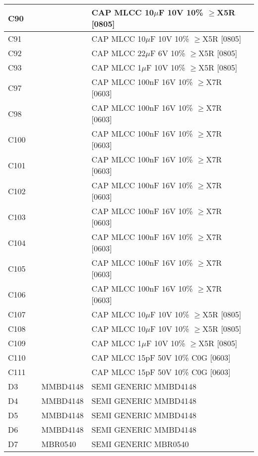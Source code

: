 \begin{longtable}{|l|l|l|l|l|}
\hline
C90 &  &  & CAP MLCC 10\ensuremath{\mu}F 10V 10\% \ensuremath{\geq}X5R [0805] &  \\
\hline
C91 &  &  & CAP MLCC 10\ensuremath{\mu}F 10V 10\% \ensuremath{\geq}X5R [0805] &  \\
\hline
C92 &  &  & CAP MLCC 22\ensuremath{\mu}F 6V 10\% \ensuremath{\geq}X5R [0805] &  \\
\hline
C93 &  &  & CAP MLCC 1\ensuremath{\mu}F 10V 10\% \ensuremath{\geq}X5R [0805] &  \\
\hline
C97 &  &  & CAP MLCC 100nF 16V 10\% \ensuremath{\geq}X7R [0603] &  \\
\hline
C98 &  &  & CAP MLCC 100nF 16V 10\% \ensuremath{\geq}X7R [0603] &  \\
\hline
C100 &  &  & CAP MLCC 100nF 16V 10\% \ensuremath{\geq}X7R [0603] &  \\
\hline
C101 &  &  & CAP MLCC 100nF 16V 10\% \ensuremath{\geq}X7R [0603] &  \\
\hline
C102 &  &  & CAP MLCC 100nF 16V 10\% \ensuremath{\geq}X7R [0603] &  \\
\hline
C103 &  &  & CAP MLCC 100nF 16V 10\% \ensuremath{\geq}X7R [0603] &  \\
\hline
C104 &  &  & CAP MLCC 100nF 16V 10\% \ensuremath{\geq}X7R [0603] &  \\
\hline
C105 &  &  & CAP MLCC 100nF 16V 10\% \ensuremath{\geq}X7R [0603] &  \\
\hline
C106 &  &  & CAP MLCC 100nF 16V 10\% \ensuremath{\geq}X7R [0603] &  \\
\hline
C107 &  &  & CAP MLCC 10\ensuremath{\mu}F 10V 10\% \ensuremath{\geq}X5R [0805] &  \\
\hline
C108 &  &  & CAP MLCC 10\ensuremath{\mu}F 10V 10\% \ensuremath{\geq}X5R [0805] &  \\
\hline
C109 &  &  & CAP MLCC 1\ensuremath{\mu}F 10V 10\% \ensuremath{\geq}X5R [0805] &  \\
\hline
C110 &  &  & CAP MLCC 15pF 50V 10\% C0G [0603] &  \\
\hline
C111 &  &  & CAP MLCC 15pF 50V 10\% C0G [0603] &  \\
\hline
D3 &  & MMBD4148 & SEMI GENERIC MMBD4148 &  \\
\hline
D4 &  & MMBD4148 & SEMI GENERIC MMBD4148 &  \\
\hline
D5 &  & MMBD4148 & SEMI GENERIC MMBD4148 &  \\
\hline
D6 &  & MMBD4148 & SEMI GENERIC MMBD4148 &  \\
\hline
D7 &  & MBR0540 & SEMI GENERIC MBR0540 &  \\

\end{longtable}

